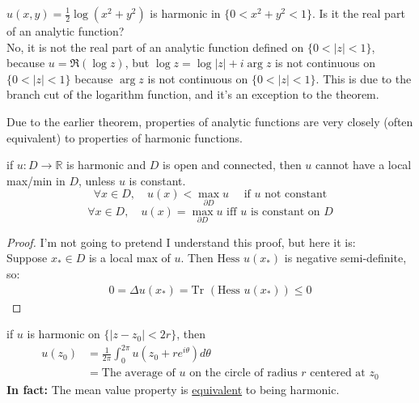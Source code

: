\begin{example}
    $u(x, y) = \frac{1}2 \log(x^2 + y^2)$ is harmonic in $\{0 < x^2 + y^2 < 1\}$. Is it the real part of an analytic function?\\

    No, it is not the real part of an analytic function defined on $\{ 0 < |z| < 1\}$, because $u = \Re(\log z)$, but $\log z = \log |z| + i\arg z$ is not continuous on $\{0 < |z| < 1\}$ because $\arg z$ is not continuous on $\{0 < |z| < 1\}$. This is due to the branch cut of the logarithm function, and it's an exception to the theorem.

\end{example}

\begin{remark}
    Due to the earlier theorem, properties of analytic functions are very closely (often equivalent) to properties of harmonic functions.
\end{remark}

\begin{lemma}
    if $u: D \rightarrow \mathbb{R}$ is harmonic and $D$ is open and connected, then $u$ cannot have a local max/min in $D$, unless $u$ is constant.
    $$ \forall x \in D, \quad u(x) < \max_{\partial D} u \quad \text{ if }u \text{ not constant}$$
    $$ \forall x \in D, \quad u(x) = \max_{\partial D} u \text{ iff } u \text{ is constant on } D$$
\end{lemma}
\begin{proof}
    I'm not going to pretend I understand this proof, but here it is:\\
    Suppose $x_* \in D$ is a local max of $u$. Then $\text{Hess } u(x_*)$ is negative semi-definite, so:
    \begin{align*}
        0 = \Delta u(x_*) = \text{Tr }( \text{Hess } u(x_*)) \leq 0
    \end{align*}

\end{proof}

\begin{lemma}
    if $u$ is harmonic on $\{ |z - z_0| < 2r\}$, then
    \begin{align*}
        u(z_0) & = \frac{1}{2\pi} \int_0^{2\pi} u(z_0 + re^{i\theta}) d\theta                           \\
               & = \text{The average of } u \text{ on the circle of radius } r \text{ centered at } z_0
    \end{align*}
    \textbf{In fact:} The mean value property is \underline{equivalent} to being harmonic.
\end{lemma}

